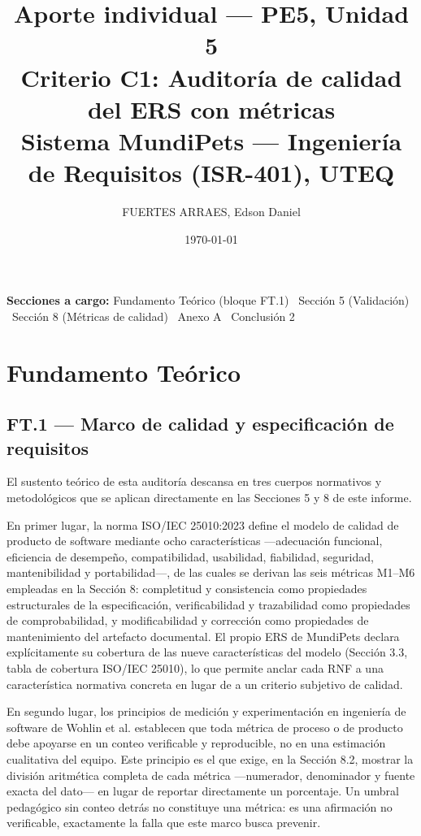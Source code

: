 \documentclass[11pt]{article}
\title{\textbf{Aporte individual --- PE5, Unidad 5}\\[4pt]
	\large Criterio C1: Auditoría de calidad del ERS con métricas\\[2pt]
	\normalsize Sistema MundiPets --- Ingeniería de Requisitos (ISR-401), UTEQ}
\author{FUERTES ARRAES, Edson Daniel}
\date{\today}
\begin{document}
	
	\maketitle
	
	\noindent\textbf{Secciones a cargo:} Fundamento Teórico (bloque FT.1) \textbullet\ Sección 5 (Validación) \textbullet\ Sección 8 (Métricas de calidad) \textbullet\ Anexo A \textbullet\ Conclusión 2
	
	\vspace{0.4cm}
	
	\section*{Fundamento Teórico}
	
	\subsection*{FT.1 --- Marco de calidad y especificación de requisitos}
	
	El sustento teórico de esta auditoría descansa en tres cuerpos normativos y metodológicos que se aplican directamente en las Secciones 5 y 8 de este informe.
	
	En primer lugar, la norma ISO/IEC 25010:2023 \cite{iso25010} define el modelo de calidad de producto de software mediante ocho características ---adecuación funcional, eficiencia de desempeño, compatibilidad, usabilidad, fiabilidad, seguridad, mantenibilidad y portabilidad---, de las cuales se derivan las seis métricas M1--M6 empleadas en la Sección 8: completitud y consistencia como propiedades estructurales de la especificación, verificabilidad y trazabilidad como propiedades de comprobabilidad, y modificabilidad y corrección como propiedades de mantenimiento del artefacto documental. El propio ERS de MundiPets declara explícitamente su cobertura de las nueve características del modelo (Sección 3.3, tabla de cobertura ISO/IEC 25010), lo que permite anclar cada RNF a una característica normativa concreta en lugar de a un criterio subjetivo de calidad.
	
	En segundo lugar, los principios de medición y experimentación en ingeniería de software de Wohlin et al. \cite{wohlin2012} establecen que toda métrica de proceso o de producto debe apoyarse en un conteo verificable y reproducible, no en una estimación cualitativa del equipo. Este principio es el que exige, en la Sección 8.2, mostrar la división aritmética completa de cada métrica ---numerador, denominador y fuente exacta del dato--- en lugar de reportar directamente un porcentaje. Un umbral pedagógico sin conteo detrás no constituye una métrica: es una afirmación no verificable, exactamente la falla que este marco busca prevenir.
	
\end{document}
